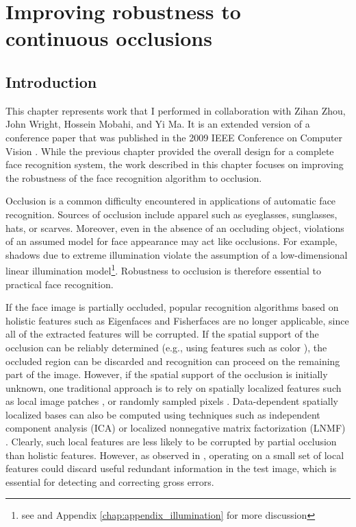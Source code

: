 \chapter{Improving robustness to continuous occlusions}
\label{chap:markov}

\section{Introduction} 


This chapter represents work that I performed in collaboration with Zihan Zhou,
John Wright, Hossein Mobahi, and Yi Ma.  It is an extended version of a
conference paper that was published in the 2009 IEEE Conference on Computer
Vision \cite{ZhouZ2009}.  While the previous chapter provided the overall
design for a complete face recognition system, the work described in this
chapter focuses on improving the robustness of the face recognition algorithm
to occlusion.

Occlusion is a common difficulty encountered in applications of automatic face
recognition. Sources of occlusion include apparel such as  eyeglasses,
sunglasses, hats, or scarves. 
Moreover, even in the absence of an occluding object,
violations of an assumed model for face appearance may act like occlusions. For example, shadows due to extreme illumination violate the assumption of a
low-dimensional linear illumination model\footnote{see \cite{Basri2003-PAMI} and Appendix
\ref{chap:appendix_illumination} for more discussion}. Robustness to
occlusion is therefore essential to practical face recognition.

If the face image is partially occluded, popular recognition algorithms based
on holistic features such as Eigenfaces and Fisherfaces
\cite{Turk1991-CVPR,Belhumeur1997-PAMI} are no longer applicable, since all of
the extracted features will be corrupted. If the spatial support of the
occlusion can be reliably determined (e.g., using features such as color
\cite{Jia2008-FGR,Jia2009-CVPR}), the occluded region can be discarded and
recognition can proceed on the remaining part of the image. However, if the
spatial support of the occlusion is initially unknown, one traditional approach
is to rely on spatially localized features such as local image patches
\cite{Martinez-02,Pentland1994-CVPR,Ahonen2006-PAMI}, or randomly sampled
pixels \cite{Leonardis2000-CVIU,Fidler2006-PAMI}. Data-dependent spatially
localized bases can also be computed using techniques such as independent
component analysis (ICA) or localized nonnegative matrix factorization (LNMF)
\cite{KimJ2005-PAMI,LiS2001-CVPR}. Clearly, such local features are less likely
to be corrupted by partial occlusion than holistic features. However, as
observed in \cite{Wright2009-PAMI}, operating on a small set of local features
could discard useful redundant information in the test image, which is
essential for detecting and correcting gross errors.

